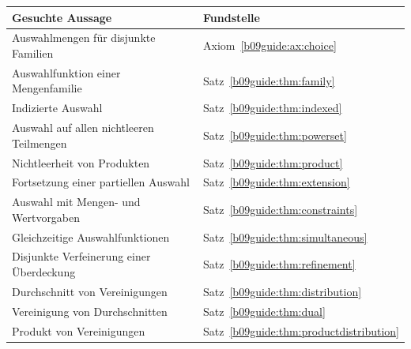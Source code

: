 \begin{center}
\small
\begin{tabularx}{\linewidth}{@{}Xl@{}}
\toprule
Gesuchte Aussage & Fundstelle\\
\midrule
Auswahlmengen für disjunkte Familien & Axiom~\ref{b09guide:ax:choice}\\
Auswahlfunktion einer Mengenfamilie & Satz~\ref{b09guide:thm:family}\\
Indizierte Auswahl & Satz~\ref{b09guide:thm:indexed}\\
Auswahl auf allen nichtleeren Teilmengen & Satz~\ref{b09guide:thm:powerset}\\
Nichtleerheit von Produkten & Satz~\ref{b09guide:thm:product}\\
Fortsetzung einer partiellen Auswahl & Satz~\ref{b09guide:thm:extension}\\
Auswahl mit Mengen- und Wertvorgaben & Satz~\ref{b09guide:thm:constraints}\\
Gleichzeitige Auswahlfunktionen & Satz~\ref{b09guide:thm:simultaneous}\\
Disjunkte Verfeinerung einer Überdeckung & Satz~\ref{b09guide:thm:refinement}\\
Durchschnitt von Vereinigungen & Satz~\ref{b09guide:thm:distribution}\\
Vereinigung von Durchschnitten & Satz~\ref{b09guide:thm:dual}\\
Produkt von Vereinigungen & Satz~\ref{b09guide:thm:productdistribution}\\
\bottomrule
\end{tabularx}
\end{center}
